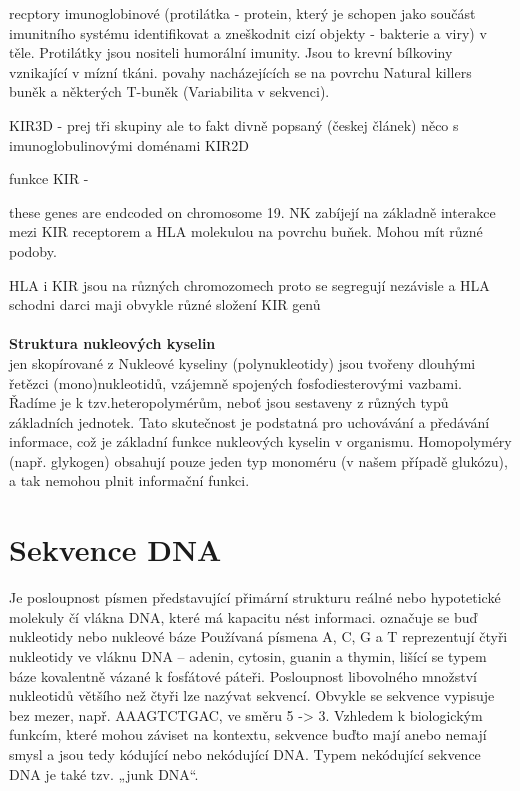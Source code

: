 \documentclass[czech,DP]{thesiskiv}
\begin{document}
recptory imunoglobinové (protilátka - protein, který je schopen jako součást imunitního systému identifikovat a zneškodnit cizí objekty - bakterie a viry) v těle. Protilátky jsou nositeli humorální imunity. Jsou to krevní bílkoviny vznikající v mízní tkáni.  povahy nacházejících se na povrchu Natural killers buněk a některých T-buněk (Variabilita v sekvenci).

KIR3D - prej tři skupiny ale to fakt divně popsaný (českej článek) něco s imunoglobulinovými doménami
KIR2D

funkce KIR - 

these genes are endcoded on chromosome 19. NK zabíjejí na základně interakce mezi KIR receptorem a HLA molekulou na povrchu buňek. Mohou mít různé podoby.

HLA i KIR jsou na různých chromozomech proto se segregují nezávisle a HLA schodni darci maji obvykle různé složení KIR genů
\\
\\
\textbf{Struktura nukleových kyselin} \\
jen skopírované z %
Nukleové kyseliny (polynukleotidy) jsou tvořeny dlouhými řetězci (mono)nukleotidů, vzájemně spojených fosfodiesterovými vazbami. Řadíme je k tzv.heteropolymérům, neboť jsou sestaveny z různých typů základních jednotek. Tato skutečnost je podstatná pro uchovávání a předávání informace, což je základní funkce nukleových kyselin v organismu. Homopolyméry (např. glykogen) obsahují pouze jeden typ monoméru (v našem případě glukózu), a tak nemohou plnit informační funkci.

\section{Sekvence DNA}
Je posloupnost písmen představující přimární strukturu reálné nebo hypotetické molekuly čí vlákna DNA, které má kapacitu nést informaci.
označuje se buď nukleotidy nebo nukleové báze
Používaná písmena A, C, G a T reprezentují čtyři nukleotidy ve vláknu DNA – adenin, cytosin, guanin a thymin, lišící se 
typem báze kovalentně vázané k fosfátové páteři. Posloupnost libovolného množství nukleotidů většího než čtyři lze nazývat 
sekvencí. Obvykle se sekvence vypisuje bez mezer, např. AAAGTCTGAC, ve směru 5 -> 3. Vzhledem k biologickým funkcím, které 
mohou záviset na kontextu, sekvence buďto mají anebo nemají smysl a jsou tedy kódující nebo nekódující DNA. Typem nekódující 
sekvence DNA je také tzv. „junk DNA“.
\end{document}
